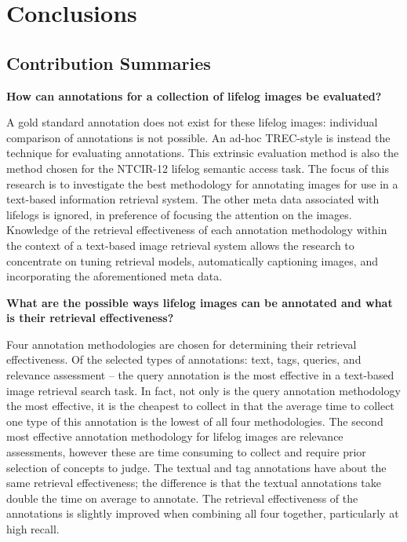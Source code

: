 \chapter{Conclusions}

\section{Contribution Summaries}

\textbf{How can annotations for a collection of lifelog images be evaluated?}

A gold standard annotation does not exist for these lifelog images: individual comparison of annotations is not possible. An ad-hoc TREC-style is instead the technique for evaluating annotations. This extrinsic evaluation method is also the method chosen for the NTCIR-12 lifelog semantic access task. The focus of this research is to investigate the best methodology for annotating images for use in a text-based information retrieval system. The other meta data associated with lifelogs is ignored, in preference of focusing the attention on the images. Knowledge of the retrieval effectiveness of each annotation methodology within the context of a text-based image retrieval system allows the research to concentrate on tuning retrieval models, automatically captioning images, and incorporating the aforementioned meta data. 

\textbf{What are the possible ways lifelog images can be annotated and what is their retrieval effectiveness?
}

Four annotation methodologies are chosen for determining their retrieval effectiveness. Of the selected types of annotations: text, tags, queries, and relevance assessment -- the query annotation is the most effective in a text-based image retrieval search task. In fact, not only is the query annotation methodology the most effective, it is the cheapest to collect in that the average time to collect one type of this annotation is the lowest of all four methodologies. The second most effective annotation methodology for lifelog images are relevance assessments, however these are time consuming to collect and require prior selection of concepts to judge. The textual and tag annotations have about the same retrieval effectiveness; the difference is that the textual annotations take double the time on average to annotate. The retrieval effectiveness of the annotations is slightly improved when combining all four together, particularly at high recall.

